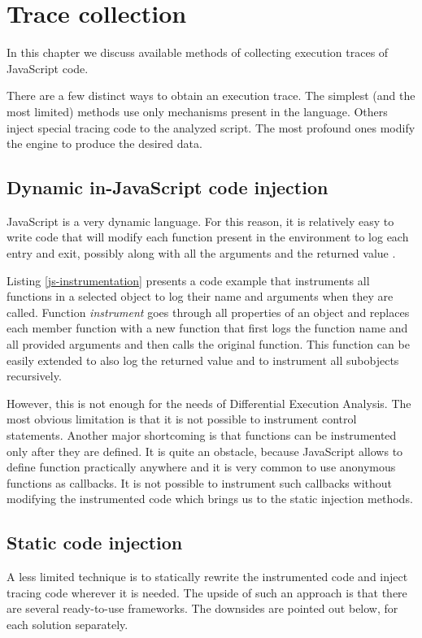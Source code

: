 \chapter{Trace collection}

In this chapter we discuss available methods of collecting execution traces of JavaScript code.

There are a few distinct ways to obtain an execution trace. 
The simplest (and the most limited) methods use only mechanisms present in the language.
Others inject special tracing code to the analyzed script. The most profound ones modify the engine to produce
the desired data.

\section{Dynamic in-JavaScript code injection}
JavaScript is a very dynamic language. For this reason, it is relatively easy to write code that will
modify each function present in the environment to log each entry and exit,
possibly along with all the arguments and the returned value \cite{stack:js-console-log}.

Listing \ref{js-instrumentation} presents a code example that instruments all functions in a selected object
to log their name and arguments when they are called.
Function \emph{instrument} goes through all properties of an object and 
replaces each member function with a new function that first logs the function
name and all provided arguments and then calls the original function. This function can be easily extended to also log the returned value and to instrument all subobjects recursively.

However, this is not enough for the needs of Differential Execution Analysis. 
The most obvious limitation is that it is not possible to instrument control statements.
Another major shortcoming is that functions can be instrumented only after they are defined. 
It is quite an obstacle, because JavaScript allows to define function practically anywhere and it is very common
to use anonymous functions as callbacks. It is not possible to instrument such callbacks 
without modifying the instrumented code which brings us to the static injection methods.



\section{Static code injection}
\label{static-injection}
A less limited technique is to statically rewrite the instrumented code and inject tracing code wherever it is needed.
The upside of such an approach is that there are several ready-to-use frameworks.
The downsides are pointed out below, for each solution separately.

